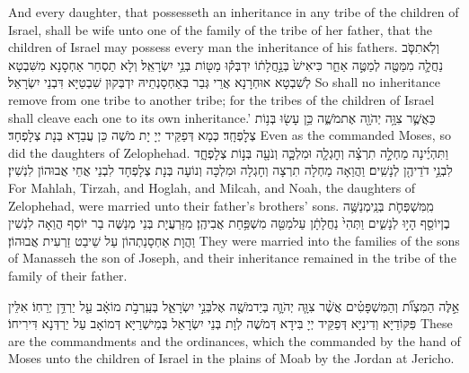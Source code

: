 {And every daughter, that possesseth an inheritance in any tribe of the children of Israel, shall be wife unto one of the family of the tribe of her father, that the children of Israel may possess every man the inheritance of his fathers.}{}
{וְלֹֽא\maqqaf תִסֹּ֧ב נַחֲלָ֛ה מִמַּטֶּ֖ה לְמַטֶּ֣ה אַחֵ֑ר כִּי\maqqaf אִישׁ֙ בְּנַ֣חֲלָת֔וֹ יִדְבְּק֕וּ מַטּ֖וֹת בְּנֵ֥י יִשְׂרָאֵֽל׃}
{וְלָא תַסְחַר אַחְסָנָא מִשִּׁבְטָא לְשִׁבְטָא אוּחְרָנָא אֲרֵי גְּבַר בְּאַחְסָנְתֵיהּ יִדְבְּקוּן שִׁבְטַיָּא דִּבְנֵי יִשְׂרָאֵל׃}
{So shall no inheritance remove from one tribe to another tribe; for the tribes of the children of Israel shall cleave each one to its own inheritance.’}{}
{כַּאֲשֶׁ֛ר צִוָּ֥ה יְהֹוָ֖ה אֶת\maqqaf מֹשֶׁ֑ה כֵּ֥ן עָשׂ֖וּ בְּנ֥וֹת צְלׇפְחָֽד׃}
{כְּמָא דְּפַקֵּיד יְיָ יָת מֹשֶׁה כֵּן עֲבַדָא בְּנָת צְלָפְחָד׃}
{Even as the \lord\space commanded Moses, so did the daughters of Zelophehad.}{}
{וַתִּהְיֶ֜ינָה מַחְלָ֣ה תִרְצָ֗ה וְחׇגְלָ֧ה וּמִלְכָּ֛ה וְנֹעָ֖ה בְּנ֣וֹת צְלׇפְחָ֑ד לִבְנֵ֥י דֹדֵיהֶ֖ן לְנָשִֽׁים׃}
{וַהֲוַאָה מַחְלָה תִרְצָה וְחָגְלָה וּמִלְכָּה וְנוֹעָה בְּנָת צְלָפְחָד לִבְנֵי אֲחֵי אֲבוּהוֹן לִנְשִׁין׃}
{For Mahlah, Tirzah, and Hoglah, and Milcah, and Noah, the daughters of Zelophehad, were married unto their father’s brothers’ sons.}{}
{מִֽמִּשְׁפְּחֹ֛ת בְּנֵֽי\maqqaf מְנַשֶּׁ֥ה בֶן\maqqaf יוֹסֵ֖ף הָי֣וּ לְנָשִׁ֑ים וַתְּהִי֙ נַחֲלָתָ֔ן עַל\maqqaf מַטֵּ֖ה מִשְׁפַּ֥חַת אֲבִיהֶֽן׃}
{מִזַּרְעֲיָת בְּנֵי מְנַשֶּׁה בַר יוֹסֵף הֲוַאָה לִנְשִׁין וַהֲוָת אַחְסָנַתְהוֹן עַל שֵׁיבַט זַרְעִית אֲבוּהוֹן׃}
{They were married into the families of the sons of Manasseh the son of Joseph, and their inheritance remained in the tribe of the family of their father.}{}

{אֵ֣לֶּה הַמִּצְוֺ֞ת וְהַמִּשְׁפָּטִ֗ים אֲשֶׁ֨ר צִוָּ֧ה יְהֹוָ֛ה בְּיַד\maqqaf מֹשֶׁ֖ה אֶל\maqqaf בְּנֵ֣י יִשְׂרָאֵ֑ל בְּעַֽרְבֹ֣ת מוֹאָ֔ב עַ֖ל יַרְדֵּ֥ן יְרֵחֽוֹ׃}
{אִלֵּין פִּקּוֹדַיָּא וְדִינַיָּא דְּפַקֵּיד יְיָ בִּידָא דְּמֹשֶׁה לְוָת בְּנֵי יִשְׂרָאֵל בְּמֵישְׁרַיָּא דְּמוֹאָב עַל יַרְדְּנָא דִּירִיחוֹ׃}
{These are the commandments and the ordinances, which the \lord\space commanded by the hand of Moses unto the children of Israel in the plains of Moab by the Jordan at Jericho.}{}

\newperek
\chazak
